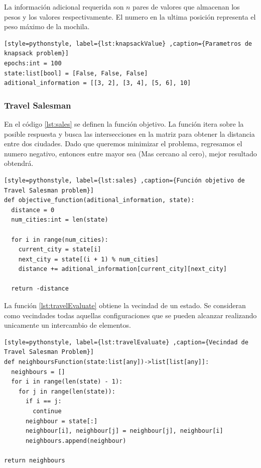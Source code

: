 \documentclass[12pt,twoside]{article}
\begin{document}
La información adicional requerida son $n$ pares de valores que almacenan los pesos y los valores respectivamente. El numero en la ultima posición representa el peso máximo de la mochila.

\begin{lstlisting}[style=pythonstyle, label={lst:knapsackValue} ,caption={Parametros de knapsack problem}]
epochs:int = 100
state:list[bool] = [False, False, False]
aditional_information = [[3, 2], [3, 4], [5, 6], 10]
\end{lstlisting}

\clearpage
\subsubsection{Travel Salesman}

En el código \ref{lst:sales} se definen la función objetivo. La función itera sobre la posible respuesta y busca las intersecciones en la matriz para obtener la distancia entre dos ciudades. Dado que queremos minimizar el problema, regresamos el numero negativo, entonces entre mayor sea (Mas cercano al cero), mejor resultado obtendrá.

\begin{lstlisting}[style=pythonstyle, label={lst:sales} ,caption={Función objetivo de Travel Salesman problem}]
def objective_function(aditional_information, state):
  distance = 0
  num_cities:int = len(state)

  for i in range(num_cities):
    current_city = state[i]
    next_city = state[(i + 1) % num_cities]  
    distance += aditional_information[current_city][next_city]

  return -distance
\end{lstlisting}

La función \ref{lst:travelEvaluate} obtiene la vecindad de un estado. Se consideran como vecindades todas aquellas configuraciones que se pueden alcanzar realizando unicamente un intercambio de elementos.

\begin{lstlisting}[style=pythonstyle, label={lst:travelEvaluate} ,caption={Vecindad de Travel Salesman Problem}]
def neighboursFunction(state:list[any])->list[list[any]]:
  neighbours = []
  for i in range(len(state) - 1):
    for j in range(len(state)):
      if i == j:
        continue
      neighbour = state[:]
      neighbour[i], neighbour[j] = neighbour[j], neighbour[i]
      neighbours.append(neighbour)

return neighbours
\end{lstlisting}
\end{document}
